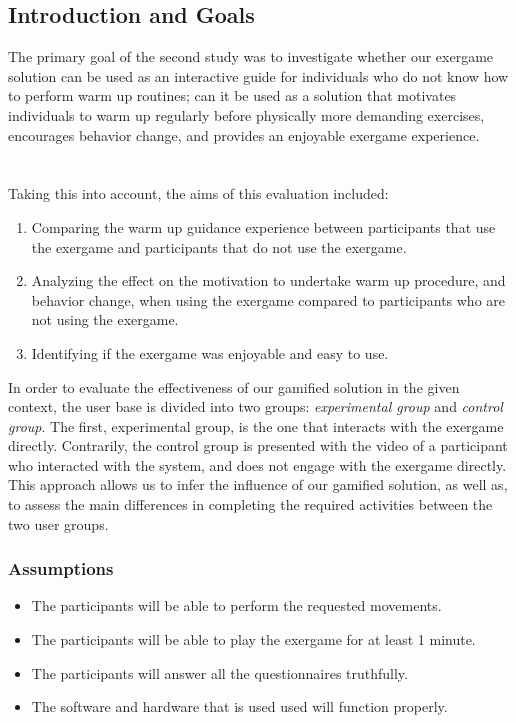 \subsection{Introduction and Goals} \label{chapter:goals}
The primary goal of the second study was to investigate whether our exergame solution can be used as an interactive guide for individuals who do not know how to perform warm up routines; can it be used as a solution that motivates individuals to warm up regularly before physically more demanding exercises, encourages behavior change, and provides an enjoyable exergame experience. \\\\\\Taking this into account, the aims of this evaluation included: 
\begin{enumerate}
\item Comparing the warm up guidance experience between participants that use the exergame and participants that do not use the exergame.
\item Analyzing the effect on the motivation to undertake warm up procedure, and behavior change, when using the exergame compared to participants who are not using the exergame.
\item Identifying if the exergame was enjoyable and easy to use.
\end{enumerate}
In order to evaluate the effectiveness of our gamified solution in the given context, the user base is divided into two groups: \textit{experimental group} and \textit{control group}. The first, experimental group, is the one that interacts with the exergame directly. Contrarily, the control group is presented with the video of a participant who interacted with the system, and does not engage with the exergame directly. This approach allows us to infer the influence of our gamified solution, as well as, to assess the main differences in completing the required activities between the two user groups. 
\subsubsection{Assumptions}
\begin{itemize}
\item The participants will be able to perform the requested movements.
\item The participants will be able to play the exergame for at least 1 minute.
\item The participants will answer all the questionnaires truthfully.
\item The software and hardware that is used used will function properly.
\end{itemize}
